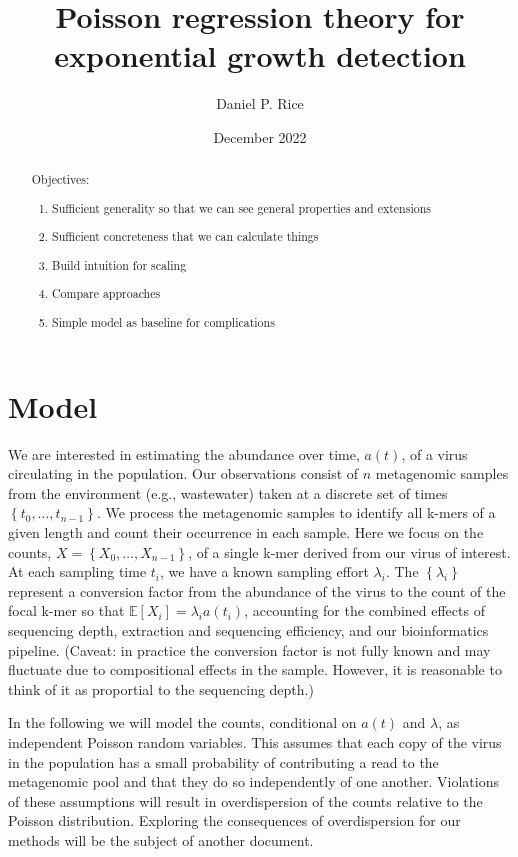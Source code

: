 \documentclass[12pt, letterpaper]{article}
\title{Poisson regression theory for exponential growth detection}
\author{Daniel P. Rice}
\date{December 2022}
\begin{document}
\maketitle

\begin{abstract}
    Objectives:
    \begin{enumerate}
        \item Sufficient generality so that we can see general properties and extensions
        \item Sufficient concreteness that we can calculate things
        \item Build intuition for scaling
        \item Compare approaches
        \item Simple model as baseline for complications
    \end{enumerate}
\end{abstract}

\section{Model}

We are interested in estimating the abundance over time, $a(t)$, of a virus circulating in the population.
Our observations consist of $n$ metagenomic samples from the environment (e.g., wastewater) taken at a discrete set of times $\left\{t_0, \ldots, t_{n-1}\right\}$.
We process the metagenomic samples to identify all k-mers of a given length and count their occurrence in each sample.
Here we focus on the counts, $X = \left\{X_0, \ldots, X_{n-1}\right\}$, of a single k-mer derived from our virus of interest.
At each sampling time $t_i$, we have a known sampling effort $\lambda_i$.
The $\left\{\lambda_i\right\}$ represent a conversion factor from the abundance of the virus to the count of the focal k-mer so that $\mathbb{E}\left[X_i\right] = \lambda_i a(t_i)$,
accounting for the combined effects of sequencing depth, extraction and sequencing efficiency, and our bioinformatics pipeline.
(Caveat: in practice the conversion factor is not fully known and may fluctuate due to compositional effects in the sample. However, it is reasonable to think of it as proportial to the sequencing depth.)

In the following we will model the counts, conditional on $a(t)$ and $\lambda$, as independent Poisson random variables.
This assumes that each copy of the virus in the population has a small probability of contributing a read to the metagenomic pool and that they do so independently of one another.
Violations of these assumptions will result in overdispersion of the counts relative to the Poisson distribution.
Exploring the consequences of overdispersion for our methods will be the subject of another document.
\end{document}
